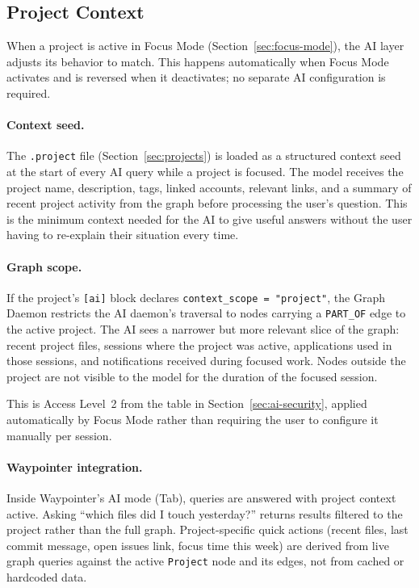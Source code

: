 \subsection{Project Context}
\label{sec:ai-project-context}

When a project is active in Focus Mode (Section~\ref{sec:focus-mode}), the AI
layer adjusts its behavior to match. This happens automatically when Focus Mode
activates and is reversed when it deactivates; no separate AI configuration is
required.

\paragraph{Context seed.}
The \texttt{.project} file (Section~\ref{sec:projects}) is loaded as a
structured context seed at the start of every AI query while a project is
focused. The model receives the project name, description, tags, linked
accounts, relevant links, and a summary of recent project activity from the
graph before processing the user's question. This is the minimum context
needed for the AI to give useful answers without the user having to re-explain
their situation every time.

\paragraph{Graph scope.}
If the project's \texttt{[ai]} block declares
\texttt{context\_scope = "project"}, the Graph Daemon restricts the AI
daemon's traversal to nodes carrying a \texttt{PART\_OF} edge to the active
project. The AI sees a narrower but more relevant slice of the graph: recent
project files, sessions where the project was active, applications used in
those sessions, and notifications received during focused work. Nodes outside
the project are not visible to the model for the duration of the focused
session.

This is Access Level~2 from the table in Section~\ref{sec:ai-security}, applied
automatically by Focus Mode rather than requiring the user to configure it
manually per session.

\paragraph{Waypointer integration.}
Inside Waypointer's AI mode (Tab), queries are answered with project context
active. Asking ``which files did I touch yesterday?'' returns results filtered
to the project rather than the full graph. Project-specific quick actions
(recent files, last commit message, open issues link, focus time this week)
are derived from live graph queries against the active \texttt{Project} node
and its edges, not from cached or hardcoded data.

